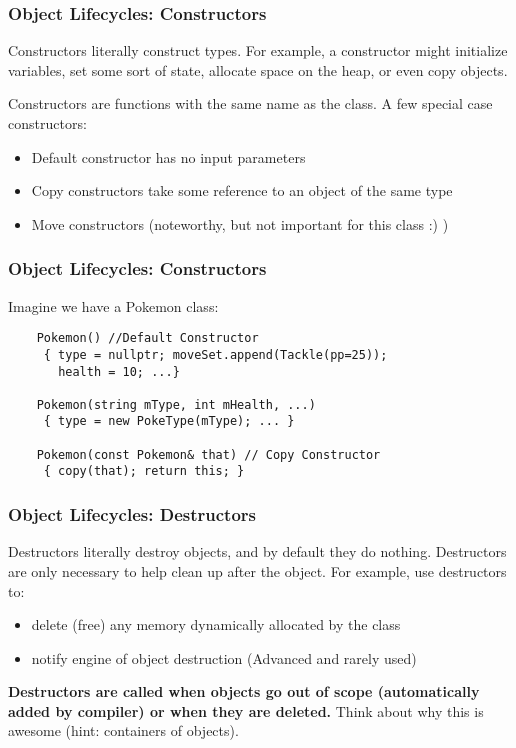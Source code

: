 \documentclass{beamer}
\begin{document}
\begin{frame}
    \frametitle{Object Lifecycles: Constructors}
    Constructors literally construct types. 
    For example, a constructor might initialize variables, set some sort of state, allocate space on the heap, or even copy objects.

    Constructors are functions with the same name as the class. A few special case constructors:
    \begin{itemize}
    \item Default constructor has no input parameters
    \item Copy constructors take some reference to an object of the same type
    \item Move constructors (noteworthy, but not important for this class :) )
    \end{itemize}


\end{frame}

\begin{frame}[fragile]
    \frametitle{Object Lifecycles: Constructors}
    Imagine we have a Pokemon class:
    \begin{verbatim}
    Pokemon() //Default Constructor
     { type = nullptr; moveSet.append(Tackle(pp=25)); 
       health = 10; ...}
    
    Pokemon(string mType, int mHealth, ...)
     { type = new PokeType(mType); ... }
    
    Pokemon(const Pokemon& that) // Copy Constructor
     { copy(that); return this; }
    \end{verbatim}
\end{frame}

\begin{frame}
\frametitle{Object Lifecycles: Destructors}
    Destructors literally destroy objects, and by default they do nothing.
    Destructors are only necessary to help clean up after the object. 
    For example, use destructors to:
    \begin{itemize}
    \item delete (free) any memory dynamically allocated by the class
    \item notify engine of object destruction (Advanced and rarely used)
    \end{itemize}

    \textbf{Destructors are called when objects go out of scope (automatically added by compiler) or when they are deleted.}
    Think about why this is awesome (hint: containers of objects).
\end{frame}
\end{document}
